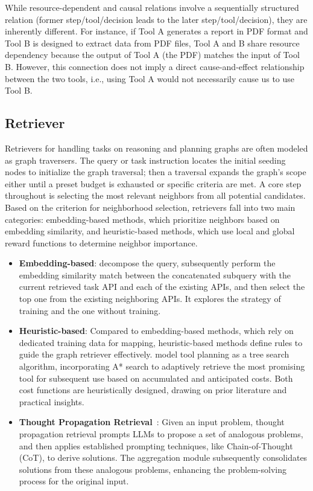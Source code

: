 While resource-dependent and causal relations involve a sequentially structured relation (former step/tool/decision leads to the later step/tool/decision), they are inherently different. For instance, if Tool A generates a report in PDF format and Tool B is designed to extract data from PDF files, Tool A and B share resource dependency because the output of Tool A (the PDF) matches the input of Tool B. However, this connection does not imply a direct cause-and-effect relationship between the two tools, i.e., using Tool A would not necessarily cause us to use Tool B.


 


\subsection{Retriever}
Retrievers for handling tasks on reasoning and planning graphs are often modeled as graph traversers. The query or task instruction locates the initial seeding nodes to initialize the graph traversal; then a traversal expands the graph's scope either until a preset budget is exhausted or specific criteria are met. A core step throughout is selecting the most relevant neighbors from all potential candidates. Based on the criterion for neighborhood selection, retrievers fall into two main categories: embedding-based methods, which prioritize neighbors based on embedding similarity, and heuristic-based methods, which use local and global reward functions to determine neighbor importance.


\begin{itemize}[leftmargin=*]
\item \textbf{Embedding-based}: \citet{wu2024can} decompose the query, subsequently perform the embedding similarity match between the concatenated subquery with the current retrieved task API and each of the existing APIs, and then select the top one from the existing neighboring APIs. It explores the strategy of training and the one without training. 


\item \textbf{Heuristic-based}: Compared to embedding-based methods, which rely on dedicated training data for mapping, heuristic-based methods define rules to guide the graph retriever effectively\cite{zhao2024large, zhuangtoolchain, hao2023reasoning}. \citet{zhuangtoolchain} model tool planning as a tree search algorithm, incorporating A* search to adaptively retrieve the most promising tool for subsequent use based on accumulated and anticipated costs. Both cost functions are heuristically designed, drawing on prior literature and practical insights.


\item \textbf{Thought Propagation Retrieval}~\cite{yu2023thought}: Given an input problem, thought propagation retrieval prompts LLMs to propose a set of analogous problems, and then applies established prompting techniques, like Chain-of-Thought (CoT), to derive solutions. The aggregation module subsequently consolidates solutions from these analogous problems, enhancing the problem-solving process for the original input.
\end{itemize}

